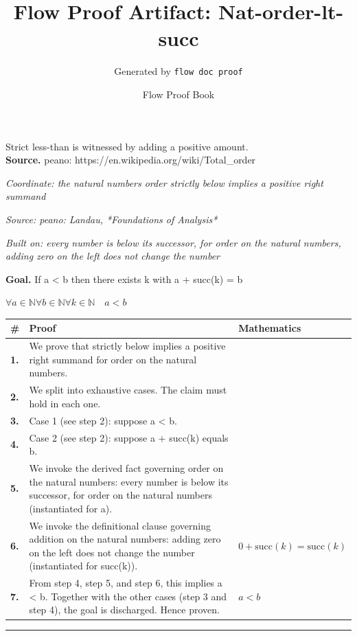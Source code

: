 \documentclass[11pt]{article}
\title{Flow Proof Artifact: Nat-order-lt-succ}
\author{Generated by \texttt{flow doc proof}}
\date{Flow Proof Book}
\theoremstyle{definition}
\begin{document}
\maketitle
Strict less-than is witnessed by adding a positive amount.\\[0.5em]
\textbf{Source.} peano: https://en.wikipedia.org/wiki/Total\_order\\[0.5em]
\bigskip
{}\par
\smallskip\noindent\textit{Coordinate: the natural numbers \cdot order \cdot strictly below implies a positive right summand}\par
\smallskip\noindent\textit{Source: peano: Landau, *Foundations of Analysis*}\par
\smallskip\noindent\textit{Built on: every number is below its successor, for order on the natural numbers, adding zero on the left does not change the number}\par
\medskip
\noindent\textbf{Goal.} If a < b then there exists k with a + succ(k) = b\par
\noindent$\displaystyle \forall a \in \mathbb{N} \forall b \in \mathbb{N} \forall k \in \mathbb{N}\quad a < b$\par
\medskip
\noindent
\begin{tabular}{@{} >{\raggedright\arraybackslash}p{} >{\raggedright\arraybackslash}p{} >{\raggedleft\arraybackslash}p{} @{}}
\textbf{\#} & \textbf{Proof} & \textbf{Mathematics} \\
\midrule
\textbf{1.} & We prove that strictly below implies a positive right summand for order on the natural numbers. & \\[0.45em]
\textbf{2.} & We split into exhaustive cases. The claim must hold in each one. & \\[0.45em]
\textbf{3.} & Case 1 (see step 2): suppose a < b. & \\[0.45em]
\textbf{4.} & Case 2 (see step 2): suppose a + succ(k)  equals  b. & \\[0.45em]
\textbf{5.} & We invoke the derived fact governing order on the natural numbers: every number is below its successor, for order on the natural numbers (instantiated for a). & \\[0.45em]
\textbf{6.} & We invoke the definitional clause governing addition on the natural numbers: adding zero on the left does not change the number (instantiated for succ(k)). & $\displaystyle 0 + \mathrm{succ}(k) = \mathrm{succ}(k)$ \\[0.45em]
\textbf{7.} & From step 4, step 5, and step 6, this implies a < b. Together with the other cases (step 3 and step 4), the goal is discharged. Hence proven. & $\displaystyle a < b$ \\[0.45em]
\bottomrule
\end{tabular}
\label{thm:Nat-order-strictly_below_implies_a_positive_right_summand}
\par\medskip\hrule
\end{document}
